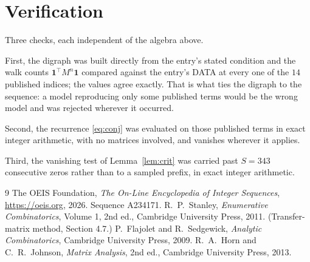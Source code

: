 \documentclass[11pt,a4paper]{article}
\theoremstyle{plain}
\theoremstyle{definition}
\begin{document}
\section{Verification}

Three checks, each independent of the algebra above.

First, the digraph was built directly from the entry's stated condition and the walk counts
$\mathbf{1}^{\!\top}M^{n}\mathbf{1}$ compared against the entry's DATA at every one of
the $14$ published indices; the values agree exactly. That is what ties the digraph to
the sequence: a model reproducing only some published terms would be the wrong model and
was rejected wherever it occurred.

Second, the recurrence \eqref{eq:conj} was evaluated on those published terms in exact
integer arithmetic, with no matrices involved, and vanishes wherever it applies.

Third, the vanishing test of Lemma~\ref{lem:crit} was carried past $S=343$ consecutive
zeros rather than to a sampled prefix, in exact integer arithmetic.

\begin{thebibliography}{9}
 The OEIS Foundation, \emph{The On-Line Encyclopedia of Integer
Sequences}, \url{https://oeis.org}, 2026. Sequence A234171.
 R.~P.~Stanley, \emph{Enumerative Combinatorics}, Volume 1, 2nd ed.,
Cambridge University Press, 2011. (Transfer-matrix method, Section 4.7.)
 P.~Flajolet and R.~Sedgewick, \emph{Analytic Combinatorics}, Cambridge
University Press, 2009.
 R.~A.~Horn and C.~R.~Johnson, \emph{Matrix Analysis}, 2nd ed., Cambridge
University Press, 2013.
\end{thebibliography}
\end{document}
